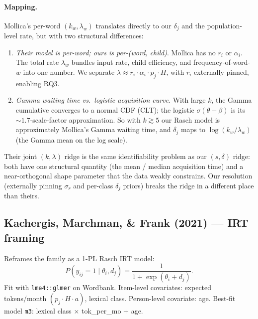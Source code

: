 \documentclass[11pt]{article}
\begin{document}
\paragraph{Mapping.} Mollica's per-word \((k_w, \lambda_w)\) translates
directly to our \(\delta_j\) and the population-level rate, but with
two structural differences:
\begin{enumerate}[leftmargin=1.3em]
\item \emph{Their model is per-word; ours is per-(word, child)}.
Mollica has no \(r_i\) or \(\alpha_i\). The total rate
\(\lambda_w\) bundles input rate, child efficiency, and
frequency-of-word-\(w\) into one number. We separate
\(\lambda \approx r_i \cdot \alpha_i \cdot p_j \cdot H\), with
\(r_i\) externally pinned, enabling RQ3.
\item \emph{Gamma waiting time vs.\ logistic acquisition curve}. With
large \(k\), the Gamma cumulative converges to a normal CDF (CLT);
the logistic \(\sigma(\theta - \beta)\) is its
\(\sim\!1.7\)-scale-factor approximation. So with \(k \gtrsim 5\)
our Rasch model is approximately Mollica's Gamma waiting time, and
\(\delta_j\) maps to \(\log(k_w / \lambda_w)\) (the Gamma mean on the
log scale).
\end{enumerate}
Their joint \((k, \lambda)\) ridge is the same identifiability problem
as our \((s, \delta)\) ridge: both have one structural quantity
(the mean / median acquisition time) and a near-orthogonal shape
parameter that the data weakly constrains. Our resolution
(externally pinning \(\sigma_r\) and per-class \(\delta_j\) priors)
breaks the ridge in a different place than theirs.

\subsection*{Kachergis, Marchman, \& Frank (2021) — IRT framing}

Reframes the family as a 1-PL Rasch IRT model:
\[
P(y_{ij} = 1 \mid \theta_i, d_j)
= \frac{1}{1 + \exp(\theta_i + d_j)}.
\]
Fit with \texttt{lme4::glmer} on Wordbank. Item-level covariates:
expected tokens/month \((p_j \cdot H \cdot a)\), lexical class.
Person-level covariate: age. Best-fit model \texttt{m3}: lexical
class \(\times\) tok\_per\_mo + age.
\end{document}
